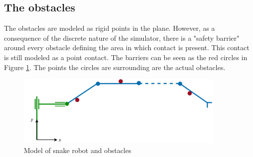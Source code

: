 \subsection{The obstacles}

The obstacles are modeled as rigid points in the plane. However, as a consequence of the discrete nature of the simulator, there is a "safety barrier" around every obstacle defining the area in which contact is present. This contact is still modeled as a point contact. The barriers can be seen as the red circles in Figure \ref{fig:2_kin_obst}. The points the circles are surrounding are the actual obstacles.

\begin{figure}
    \centering
    \includegraphics[width=0.9\textwidth]{figures/modelspecs/superbasicsnakenobstacles.pdf}
    \caption{Model of snake robot and obstacles}
    \label{fig:2_kin_obst}
\end{figure}
